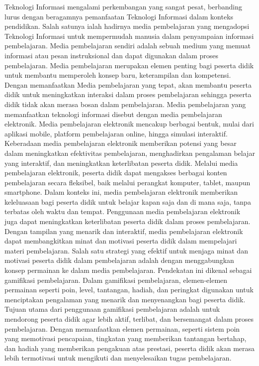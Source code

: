 Teknologi Informasi mengalami perkembangan yang sangat pesat, berbanding lurus dengan beragamnya pemanfaatan Teknologi Informasi dalam konteks pendidikan.
Salah satunya ialah hadirnya media pembelajaran yang mengadopsi Teknologi Informasi untuk mempermudah manusia dalam penyampaian informasi pembelajaran.
Media pembelajaran sendiri adalah sebuah medium yang memuat informasi atau pesan instruksional dan dapat digunakan dalam proses pembelajaran.
Media pembelajaran merupakan elemen penting bagi peserta didik untuk membantu memperoleh konsep baru, keterampilan dan kompetensi.
Dengan memanfaatkan Media pembelajaran yang tepat, akan membantu peserta didik untuk meningkatkan interaksi dalam proses pembelajaran 
sehingga peserta didik tidak akan merasa bosan dalam pembelajaran\cite{hasan2021media}.
Media pembelajaran yang memanfaatkan teknologi informasi disebut dengan media pembelajaran elektronik.
Media pembelajaran elektronik mencakup berbagai bentuk, mulai dari aplikasi mobile, platform pembelajaran online, hingga simulasi interaktif. 
Keberadaan media pembelajaran elektronik memberikan potensi yang besar dalam meningkatkan efektivitas pembelajaran, menghadirkan pengalaman belajar yang interaktif, dan meningkatkan keterlibatan peserta didik.
Melalui media pembelajaran elektronik, peserta didik dapat mengakses berbagai konten pembelajaran secara fleksibel, baik melalui perangkat komputer, tablet, maupun smartphone.
Dalam konteks ini, media pembelajaran elektronik memberikan keleluasaan bagi peserta didik untuk belajar kapan saja dan di mana saja, tanpa terbatas oleh waktu dan tempat. 
Penggunaan media pembelajaran elektronik juga dapat meningkatkan keterlibatan peserta didik dalam proses pembelajaran.
Dengan tampilan yang menarik dan interaktif, media pembelajaran elektronik dapat membangkitkan minat dan motivasi peserta didik dalam mempelajari materi pembelajaran. 
Salah satu strategi yang efektif untuk menjaga minat dan motivasi peserta didik dalam pembelajaran adalah dengan menggabungkan konsep permainan ke dalam media pembelajaran.
Pendekatan ini dikenal sebagai gamifikasi pembelajaran. Dalam gamifikasi pembelajaran, elemen-elemen permainan seperti poin, level, tantangan, hadiah, dan peringkat digunakan untuk menciptakan pengalaman yang menarik dan menyenangkan bagi peserta didik.
Tujuan utama dari penggunaan gamifikasi pembelajaran adalah untuk mendorong peserta didik agar lebih aktif, terlibat, dan bersemangat dalam proses pembelajaran.
Dengan memanfaatkan elemen permainan, seperti sistem poin yang memotivasi pencapaian, tingkatan yang memberikan tantangan bertahap, dan hadiah yang memberikan pengakuan atas prestasi, peserta didik akan merasa lebih termotivasi untuk mengikuti dan menyelesaikan tugas pembelajaran\cite{schell2008art}.

